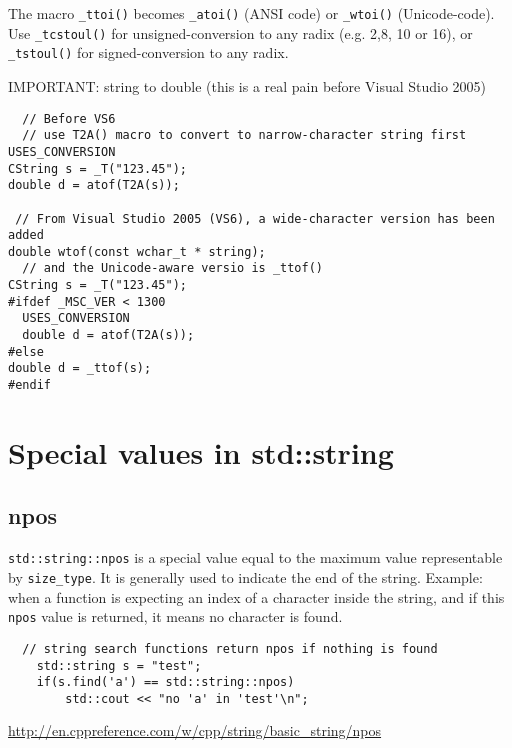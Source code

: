 The macro \verb!_ttoi()! becomes \verb!_atoi()! (ANSI code) or
\verb!_wtoi()! (Unicode-code). Use \verb!_tcstoul()! for unsigned-conversion to any radix
(e.g. 2,8, 10 or 16), or \verb!_tstoul()! for signed-conversion to any radix.

IMPORTANT: string to double (this is a real pain before Visual Studio 2005)
\begin{verbatim}
  // Before VS6
  // use T2A() macro to convert to narrow-character string first
USES_CONVERSION
CString s = _T("123.45");
double d = atof(T2A(s));   
 
 // From Visual Studio 2005 (VS6), a wide-character version has been added
double wtof(const wchar_t * string);
  // and the Unicode-aware versio is _ttof()
CString s = _T("123.45");
#ifdef _MSC_VER < 1300
  USES_CONVERSION
  double d = atof(T2A(s));
#else
double d = _ttof(s);
#endif

\end{verbatim}

\section{Special values in std::string}

\subsection{npos}
\label{sec:npos}

\verb!std::string::npos! is a special value equal to the maximum value
representable by \verb!size_type!.
It is generally used to indicate the end of the string.
Example: when a function is expecting an index of a character inside the string,
and if this \verb!npos! value is returned, it means no character is found.

\begin{lstlisting}
  // string search functions return npos if nothing is found
    std::string s = "test";
    if(s.find('a') == std::string::npos)
        std::cout << "no 'a' in 'test'\n";
\end{lstlisting}
\url{http://en.cppreference.com/w/cpp/string/basic_string/npos}